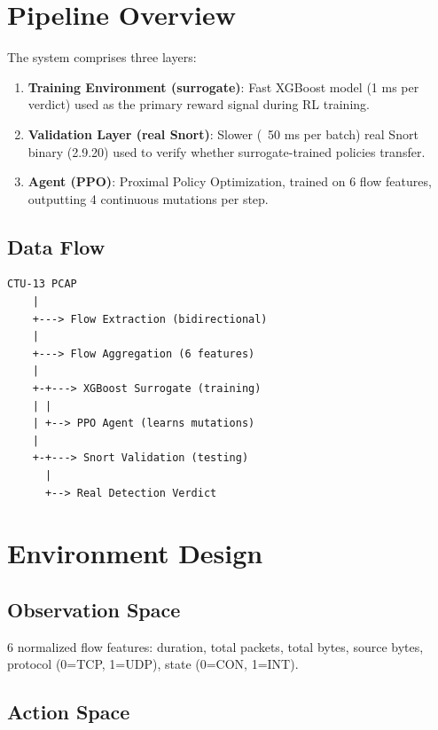 \documentclass[12pt,a4paper]{report}
\begin{document}
\section{Pipeline Overview}

The system comprises three layers:

\begin{enumerate}
  \item \textbf{Training Environment (surrogate)}: Fast XGBoost model (1 ms per verdict) used as the primary reward signal during RL training.
  
  \item \textbf{Validation Layer (real Snort)}: Slower (~50 ms per batch) real Snort binary (2.9.20) used to verify whether surrogate-trained policies transfer.
  
  \item \textbf{Agent (PPO)}: Proximal Policy Optimization, trained on 6 flow features, outputting 4 continuous mutations per step.
\end{enumerate}

\subsection{Data Flow}

\begin{verbatim}
CTU-13 PCAP
    |
    +---> Flow Extraction (bidirectional)
    |
    +---> Flow Aggregation (6 features)
    |
    +-+---> XGBoost Surrogate (training)
    | |
    | +--> PPO Agent (learns mutations)
    |
    +-+---> Snort Validation (testing)
      |
      +--> Real Detection Verdict
\end{verbatim}

\section{Environment Design}

\subsection{Observation Space}

6 normalized flow features: duration, total packets, total bytes, source bytes, protocol (0=TCP, 1=UDP), state (0=CON, 1=INT).

\subsection{Action Space}
\end{document}
